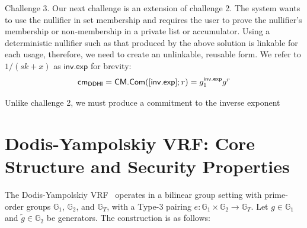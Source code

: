 Challenge 3. 
Our next challenge is an extension of challenge 2. The system wants to use the nullifier in set membership and requires the user to prove the nullifier's membership or non-membership in a private list or accumulator. Using a deterministic nullifier such as that produced by the above solution is linkable for each usage, therefore, we need to create an unlinkable, reusable form. We refer to $1/(sk + x)$ as $\mathsf{inv.exp}$ for brevity:
\[
    \mathsf{cm}_{\mathsf{DDHI}} = \mathsf{CM.Com}([\mathsf{inv.exp}];r) = g_1^{\mathsf{inv.exp}} g^r
\]


Unlike challenge 2, we must produce a commitment to the inverse exponent 











































\newpage
\section{Dodis-Yampolskiy VRF: Core Structure and Security Properties}

The Dodis-Yampolskiy VRF~\cite{hutchison_verifiable_2005} operates in a bilinear group setting with prime-order groups $\mathbb{G}_1$, $\mathbb{G}_2$, and $\mathbb{G}_T$, with a Type-3 pairing $e: \mathbb{G}_1 \times \mathbb{G}_2 \rightarrow \mathbb{G}_T$. Let $g \in \mathbb{G}_1$ and $\tilde{g} \in \mathbb{G}_2$ be generators. The construction is as follows:

